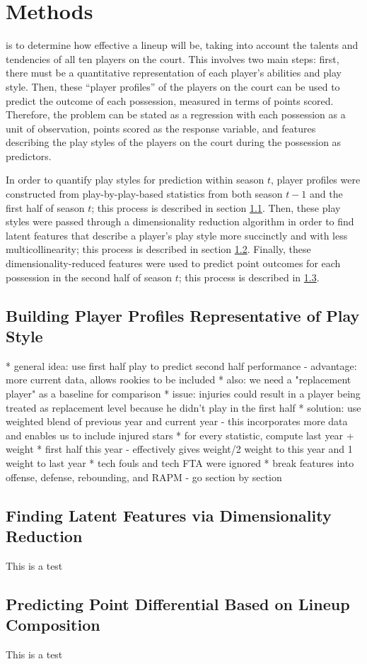 
\chapter{Methods}
\label{ch:methods}

 is to determine how
effective a lineup will be, taking into account the talents and tendencies of all
ten players on the court. This involves two main steps: first, there must be a
quantitative representation of each player's abilities and play style. Then, these
``player profiles'' of the players on the court can be used to predict the outcome
of each possession, measured in terms of points scored. Therefore, the problem can
be stated as a regression with each possession as a unit of observation, points
scored as the response variable, and features describing the play styles of the
players on the court during the possession as predictors.

In order to quantify play styles for prediction within season $t$, player profiles
were constructed from play-by-play-based statistics from both season $t-1$ and the
first half of season $t$; this process is described in section \ref{sec:profiles}.
Then, these play styles were passed through a dimensionality reduction algorithm in
order to find latent features that describe a player's play style more succinctly
and with less multicollinearity; this process is described in section
\ref{sec:dim_red}. Finally, these dimensionality-reduced features were used to
predict point outcomes for each possession in the second half of season $t$; this
process is described in \ref{sec:regress}.

\section{Building Player Profiles Representative of Play Style}
\label{sec:profiles}

* general idea: use first half play to predict second half performance
    - advantage: more current data, allows rookies to be included
* also: we need a "replacement player" as a baseline for comparison
* issue: injuries could result in a player being treated as replacement level
because he didn't play in the first half
* solution: use weighted blend of previous year and current year
    - this incorporates more data and enables us to include injured stars
* for every statistic, compute last year + weight * first half this year
    - effectively gives weight/2 weight to this year and 1 weight to last year
* tech fouls and tech FTA were ignored
* break features into offense, defense, rebounding, and RAPM
    - go section by section

\section{Finding Latent Features via Dimensionality Reduction}
\label{sec:dim_red}
This is a test

\section{Predicting Point Differential Based on Lineup Composition}
\label{sec:regress}
This is a test
